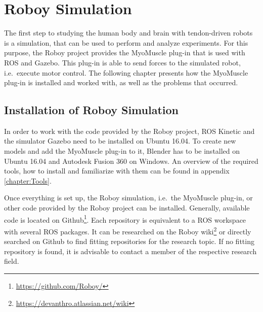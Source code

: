 
\chapter{Roboy Simulation}\label{chapter:Roboy}
The first step to studying the human body and brain with tendon-driven robots is a simulation, that can be used to perform and analyze experiments. For this purpose, the Roboy project provides the MyoMuscle plug-in \cite{BA} that is used with ROS and Gazebo. This plug-in is able to send forces to the simulated robot, i.e.\ execute motor control. The following chapter presents how the MyoMuscle plug-in is installed and worked with, as well as the problems that occurred.


\section{Installation of Roboy Simulation}
In order to work with the code provided by the Roboy project, ROS Kinetic and the simulator Gazebo need to be installed on Ubuntu 16.04\cite{ROS,Gazebo}. To create new models and add the MyoMuscle plug-in to it, Blender has to be installed on Ubuntu 16.04\cite{Blender} and Autodesk Fusion 360 on Windows\cite{Autodesk}. An overview of the required tools, how to install and familiarize with them can be found in appendix \ref{chapter:Tools}. %

Once everything is set up, the Roboy simulation, i.e.\ the MyoMuscle plug-in\cite{BA}, or other code provided by the Roboy project can be installed. Generally, available code is located on Github\footnote{\url{https://github.com/Roboy/}}. Each repository is equivalent to a ROS workspace with several ROS packages. It can be researched on the Roboy wiki\footnote{\url{https://devanthro.atlassian.net/wiki}} or directly searched on Github to find fitting repositories for the research topic. If no fitting repository is found, it is advisable to contact a member of the respective research field.

